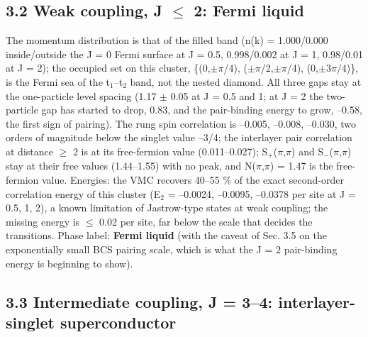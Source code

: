 \documentclass[10pt]{article}
\begin{document}
\subsection*{3.2 Weak coupling, J $\le$ 2: Fermi liquid}

The momentum distribution is that of the filled band (n(k) = 1.000/0.000 inside/outside the J = 0 Fermi surface at J = 0.5, 0.998/0.002 at J = 1, 0.98/0.01 at J = 2); the occupied set on this cluster, \{(0,$\pm$$\pi$/4), ($\pm$$\pi$/2,$\pm$$\pi$/4), (0,$\pm$3$\pi$/4)\}, is the Fermi sea of the t$_1$--t$_2$ band, not the nested diamond. All three gaps stay at the one-particle level spacing (1.17 $\pm$ 0.05 at J = 0.5 and 1; at J = 2 the two-particle gap has started to drop, 0.83, and the pair-binding energy to grow, --0.58, the first sign of pairing). The rung spin correlation is --0.005, --0.008, --0.030, two orders of magnitude below the singlet value --3/4; the interlayer pair correlation at distance $\ge$ 2 is at its free-fermion value (0.011--0.027); S$_+$($\pi$,$\pi$) and S$_-$($\pi$,$\pi$) stay at their free values (1.44--1.55) with no peak, and N($\pi$,$\pi$) = 1.47 is the free-fermion value. Energies: the VMC recovers 40--55 \% of the exact second-order correlation energy of this cluster (E$_2$ = --0.0024, --0.0095, --0.0378 per site at J = 0.5, 1, 2), a known limitation of Jastrow-type states at weak coupling; the missing energy is $\le$ 0.02 per site, far below the scale that decides the transitions. Phase label: \textbf{Fermi liquid} (with the caveat of Sec. 3.5 on the exponentially small BCS pairing scale, which is what the J = 2 pair-binding energy is beginning to show).

\subsection*{3.3 Intermediate coupling, J = 3--4: interlayer-singlet superconductor}
\end{document}
